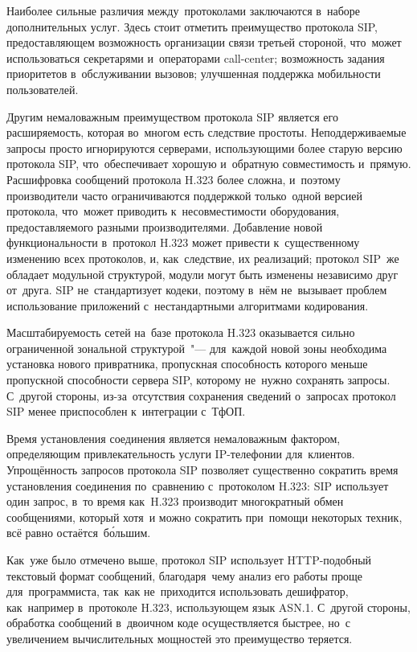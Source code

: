 Наиболее сильные различия между~протоколами заключаются в~наборе дополнительных услуг.
Здесь стоит отметить преимущество протокола SIP, предоставляющем возможность организации связи третьей стороной, что~может использоваться секретарями и~операторами call-center; возможность задания приоритетов в~обслуживании вызовов; улучшенная поддержка мобильности пользователей.

Другим немаловажным преимуществом протокола SIP является его расширяемость, которая во~многом есть следствие простоты.
Неподдерживаемые запросы просто игнорируются серверами, использующими более старую версию протокола SIP, что~обеспечивает хорошую и~обратную совместимость и~прямую.
Расшифровка сообщений протокола H.323 более сложна, и~поэтому производители часто ограничиваются поддержкой только~одной версией протокола, что~может приводить к~несовместимости оборудования, предоставляемого разными производителями.
Добавление новой функциональности в~протокол H.323 может привести к~существенному изменению всех протоколов, и, как~следствие, их реализаций; протокол SIP~же обладает модульной структурой, модули могут быть изменены независимо друг от~друга.
SIP не~стандартизует кодеки, поэтому в~нём не~вызывает проблем использование приложений с~нестандартными алгоритмами кодирования.

Масштабируемость сетей на~базе протокола H.323 оказывается сильно ограниченной зональной структурой~"--- для~каждой новой зоны необходима установка нового привратника, пропускная способность которого меньше пропускной способности сервера SIP, которому не~нужно сохранять запросы.
С~другой стороны, из-за~отсутствия сохранения сведений о~запросах протокол SIP менее приспособлен к~интеграции с~ТфОП.

Время установления соединения является немаловажным фактором, определяющим привлекательность услуги IP-телефонии для~клиентов.
Упрощённость запросов протокола SIP позволяет существенно сократить время установления соединения по~сравнению с~протоколом H.323: SIP использует один запрос, в~то время как~H.323 производит многократный обмен сообщениями, который хотя~и можно сократить при~помощи некоторых техник, всё равно остаётся~б\'{о}льшим.

Как~уже было отмечено выше, протокол SIP использует HTTP-подобный текстовый формат сообщений, благодаря~чему анализ его работы проще для~программиста, так~как не~приходится использовать дешифратор, как~например в~протоколе H.323, использующем язык ASN.1.
С~другой стороны, обработка сообщений в~двоичном коде осуществляется быстрее, но~с увеличением вычислительных мощностей это преимущество теряется.

